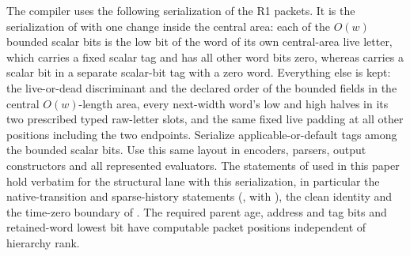 \begin{lemma}\label{q1:l9}


The compiler uses the following serialization of the R1 packets. It is the serialization of \cite[Section~\ref*{cl:sec:packets}]{DMNoise1D2026} with one change inside the central area: each of the \(O(w)\) bounded scalar bits is the low bit of the word of its own central-area live letter, which carries a fixed scalar tag and has all other word bits zero, whereas \cite[Section~\ref*{cl:sec:packets}]{DMNoise1D2026} carries a scalar bit in a separate scalar-bit tag with a zero word. Everything else is kept: the live-or-dead discriminant and the declared order of the bounded fields in the central \(O(w)\)-length area, every next-width word's low and high halves in its two prescribed typed raw-letter slots, and the same fixed live padding at all other positions including the two endpoints. Serialize applicable-or-default tags among the bounded scalar bits. Use this same layout in encoders, parsers, output constructors and all represented evaluators. The statements of \cite{DMNoise1D2026} used in this paper hold verbatim for the structural lane with this serialization, in particular the native-transition and sparse-history statements (\cite[Proposition~\ref*{cl:prop:organization}]{DMNoise1D2026}, with \cite[Lemmas~\ref*{cl:lem:endpoint} and~\ref*{cl:lem:two-period}]{DMNoise1D2026}), the clean identity \cite[Lemma~\ref*{cl:lem:clean}]{DMNoise1D2026} and the time-zero boundary of \cite[Lemma~\ref*{cl:lem:past}]{DMNoise1D2026}. The required parent age, address and tag bits and retained-word lowest bit have computable packet positions independent of hierarchy rank.

\end{lemma}

